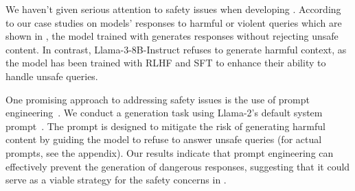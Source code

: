 We haven't given serious attention to safety issues when 
developing \ours{}.
According to our case studies on 
models' responses to harmful or violent queries which are shown 
in ,
the model trained with \ours{} generates 
responses without rejecting unsafe content.
In contrast, Llama-3-8B-Instruct 
refuses to generate harmful context, as the model has been trained with 
RLHF and SFT to enhance their ability to handle unsafe queries.


One promising approach to addressing safety issues is the use of prompt
engineering~\cite{promptsafety}. We conduct a generation task using Llama-2's
default system prompt~\cite{llama2prompt}. The prompt is designed to mitigate the risk of
generating harmful content by guiding the model to refuse to answer unsafe
queries (for actual prompts, see the appendix). Our results indicate that
prompt engineering can effectively prevent the generation
of dangerous responses, suggesting that it could serve as a viable
strategy for the safety concerns in \ours{}.